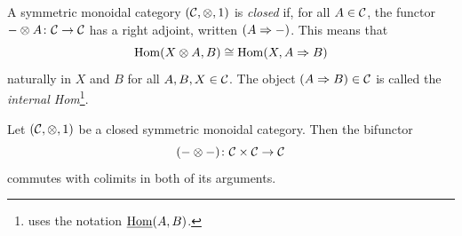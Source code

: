        \begin{definition}\label{df:closed-smc}
            A symmetric monoidal category $(\mathcal{C},\otimes,1)$ is \emph{closed} if, for all $A\in\mathcal{C}$, the functor ${-}\otimes A\colon\mathcal{C}\to\mathcal{C}$ has a right adjoint, written $(A\Rightarrow{-})$.
            This means that
            \begin{equation*}
                \operatorname{Hom}(X\otimes A,B)\cong\operatorname{Hom}(X,A\Rightarrow B)
            \end{equation*}
            naturally in $X$ and $B$ for all $A,B,X\in\mathcal{C}$.
            The object $(A\Rightarrow B)\in\mathcal{C}$ is called the \emph{internal Hom}\footnote{
                \cite{Toen:2005wxa} uses the notation $\underline{\operatorname{Hom}}(A,B)$.
            }.
        \end{definition}

        \begin{lemma}
            Let $(\mathcal{C},\otimes,1)$ be a closed symmetric monoidal category.
            Then the bifunctor
            \begin{equation*}
                ({-}\otimes{-})\colon\mathcal{C}\times\mathcal{C}\to\mathcal{C}
            \end{equation*}
            commutes with colimits in both of its arguments.
        \end{lemma}

